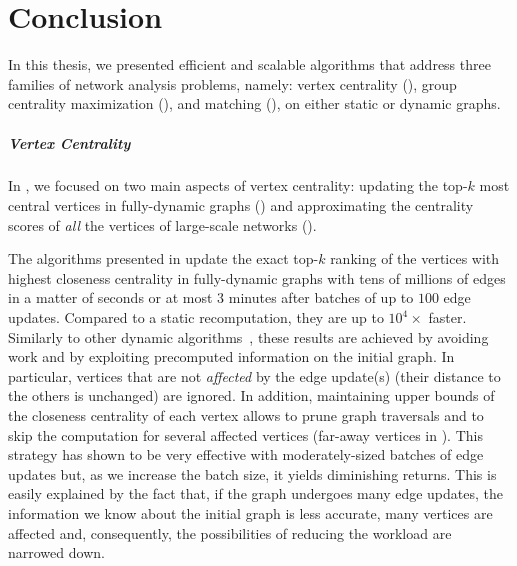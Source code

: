 \chapter*{Conclusion}

In this thesis, we presented efficient and scalable algorithms that address three
families of network analysis problems, namely: vertex centrality
(), group centrality maximization
(), and matching (), on either
static or dynamic graphs.

\paragraph{Vertex Centrality}
In , we focused on two main aspects of
vertex centrality: updating the top-$k$ most central vertices in fully-dynamic
graphs () and approximating the centrality scores of
\emph{all} the vertices of large-scale networks
().

The algorithms presented in 
update the exact top-$k$ ranking of the vertices with highest closeness
centrality in fully-dynamic graphs with tens of millions of edges in a matter
of seconds or at most $3$ minutes after batches
of up to $100$ edge updates. Compared to a static recomputation, they are up to
$10^4\times$ faster.
Similarly to other dynamic algorithms~\cite{DBLP:journals/im/BergaminiM16},
these results are achieved by avoiding  work and by
exploiting precomputed information on the initial graph.
In particular, vertices
that are not \emph{affected} by the edge update(s) (\ie their distance to the
others is unchanged) are ignored. In addition, maintaining upper bounds of the
closeness centrality of each vertex allows to prune graph traversals and to
skip the computation for several affected vertices
(\eg far-away vertices in ).
This strategy has  shown to be very effective with moderately-sized
batches of edge updates but, as we increase the batch size, it yields
diminishing returns. This is easily explained by the fact that, if the graph
undergoes many edge updates, the information we know about the initial graph is
less accurate, many vertices are affected and, consequently, the possibilities
of reducing the workload are narrowed down.


